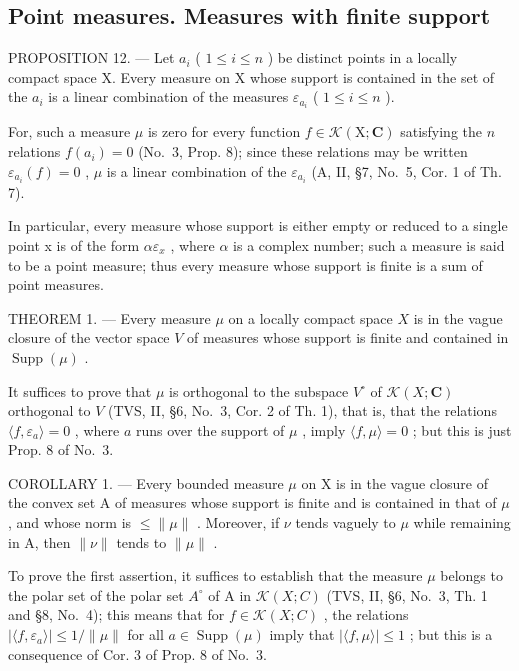 \subsection{Point measures. Measures with finite support}

PROPOSITION 12. --- Let \(a_i\) ( \(1 \leqslant i \leqslant n\) ) be distinct points in a locally compact space X. Every measure on X whose support is contained in the set of the \(a_i\) is a linear combination of the measures \(\varepsilon_{a_i}\) ( \(1 \leqslant i \leqslant n\) ).

For, such a measure \(\mu\) is zero for every function \(f\in\mathcal{K}(\mathrm{X};\mathbf{C})\) satisfying the \(n\) relations \(f(a_{i})=0\) (No.~3, Prop. 8); since these relations may be written \(\varepsilon_{a_{i}}(f)=0\) , \(\mu\) is a linear combination of the \(\varepsilon_{a_{i}}\) (A, II, §7, No.~5, Cor. 1 of Th. 7).

In particular, every measure whose support is either empty or reduced to a single point x is of the form \(\alpha\varepsilon_{x}\) , where \(\alpha\) is a complex number; such a measure is said to be a point measure; thus every measure whose support is finite is a sum of point measures.

THEOREM 1. --- Every measure \(\mu\) on a locally compact space \(X\) is in the vague closure of the vector space \(V\) of measures whose support is finite and contained in \(\operatorname{Supp}(\mu)\) .

It suffices to prove that \(\mu\) is orthogonal to the subspace \(V^{\circ}\) of \(\mathcal{K}(X; \mathbf{C})\) orthogonal to \(V\) (TVS, II, §6, No.~3, Cor. 2 of Th. 1), that is, that the relations \(\langle f, \varepsilon_{a} \rangle = 0\) , where \(a\) runs over the support of \(\mu\) , imply \(\langle f, \mu \rangle = 0\) ; but this is just Prop. 8 of No.~3.

COROLLARY 1. --- Every bounded measure \(\mu\) on X is in the vague closure of the convex set A of measures whose support is finite and is contained in that of \(\mu\) , and whose norm is \(\leqslant \| \mu \|\) . Moreover, if \(\nu\) tends vaguely to \(\mu\) while remaining in A, then \(\| \nu \|\) tends to \(\| \mu \|\) .

To prove the first assertion, it suffices to establish that the measure \(\mu\) belongs to the polar set of the polar set \(A^{\circ}\) of A in \(\mathcal{K}(X;C)\) (TVS, II, §6, No.~3, Th. 1 and §8, No.~4); this means that for \(f \in \mathcal{K}(X;C)\) , the relations \(|\langle f,\varepsilon_{a}\rangle| \leqslant 1/\|\mu\|\) for all \(a \in \operatorname{Supp}(\mu)\) imply that \(|\langle f,\mu\rangle| \leqslant 1\) ; but this is a consequence of Cor. 3 of Prop. 8 of No.~3.

